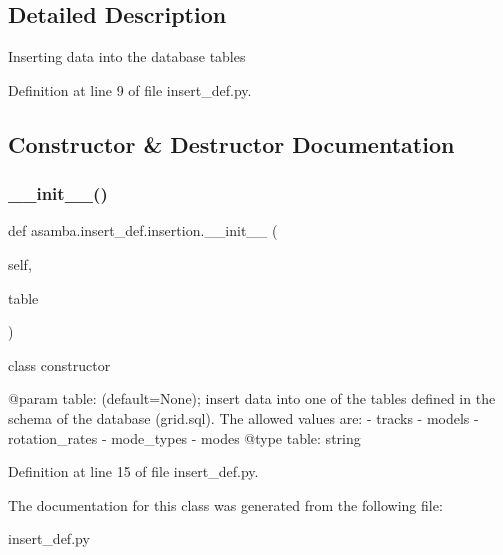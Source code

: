 \subsection{Detailed Description}
\begin{DoxyVerb}Inserting data into the database tables
\end{DoxyVerb}
 

Definition at line 9 of file insert\+\_\+def.\+py.



\subsection{Constructor \& Destructor Documentation}
\mbox{\label{classasamba_1_1insert__def_1_1insertion_a0e4e59d72941182ec69091fc07d6cef0}} 
\subsubsection{\texorpdfstring{\+\_\+\+\_\+init\+\_\+\+\_\+()}{\_\_init\_\_()}}
{\footnotesize\ttfamily def asamba.\+insert\+\_\+def.\+insertion.\+\_\+\+\_\+init\+\_\+\+\_\+ (\begin{DoxyParamCaption}\item[{}]{self,  }\item[{}]{table }\end{DoxyParamCaption})}

\begin{DoxyVerb}class constructor 

@param table: (default=None); insert data into one of the tables defined in the schema of the 
   database (grid.sql). The allowed values are:
   - tracks
   - models
   - rotation_rates
   - mode_types
   - modes
@type table: string
\end{DoxyVerb}
 

Definition at line 15 of file insert\+\_\+def.\+py.



The documentation for this class was generated from the following file\+:\begin{DoxyCompactItemize}
\item 
insert\+\_\+def.\+py\end{DoxyCompactItemize}
